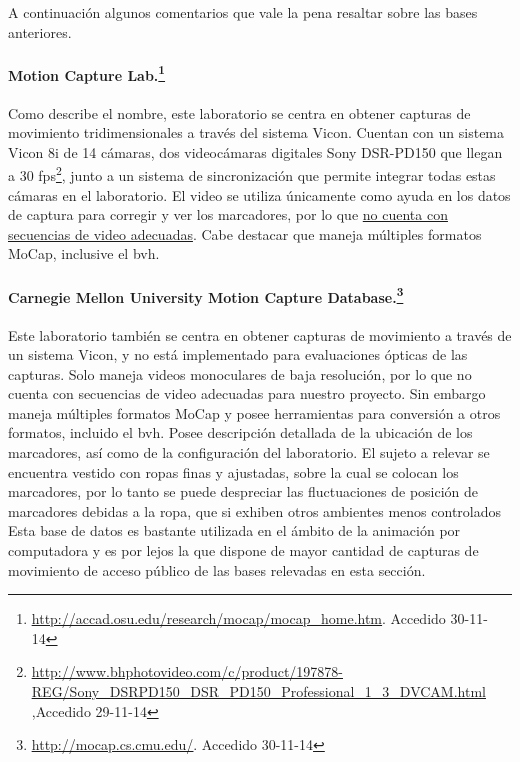 A continuación algunos comentarios que vale la pena resaltar sobre  las bases anteriores.

\paragraph{Motion Capture Lab.\footnote{\textcolor{blue}{\underline{\url{http://accad.osu.edu/research/mocap/mocap_home.htm}}}. Accedido 30-11-14}} 
		Como describe el nombre, este laboratorio se centra en obtener capturas de movimiento tridimensionales a través del sistema Vicon. Cuentan con un sistema Vicon 8i de 14 cámaras, dos videocámaras digitales Sony DSR-PD150 que llegan a 30 fps\footnote{\textcolor{blue}{\underline{\url{http://www.bhphotovideo.com/c/product/197878-REG/Sony_DSRPD150_DSR_PD150_Professional_1_3_DVCAM.html}}} ,Accedido 29-11-14 }, junto a un sistema de sincronización que permite integrar todas estas cámaras en el laboratorio. El video se utiliza únicamente como ayuda en los datos de captura para corregir y ver los marcadores,  por lo que \underline{no cuenta con secuencias de video adecuadas}. Cabe destacar que maneja múltiples formatos MoCap, inclusive el bvh.

\paragraph{Carnegie Mellon University Motion Capture Database.\footnote{\textcolor{blue}{\underline{\url{http://mocap.cs.cmu.edu/}}}. Accedido 30-11-14}}
 Este laboratorio también se centra en obtener capturas de movimiento a través de un sistema Vicon, y no está implementado para evaluaciones ópticas de las capturas. Solo maneja videos monoculares de baja resolución, por lo que no cuenta con secuencias de video adecuadas para nuestro proyecto. Sin embargo maneja múltiples formatos MoCap y  posee herramientas para conversión a otros formatos, incluido el bvh. Posee descripción detallada de la ubicación de los marcadores, así como de la configuración del laboratorio. El sujeto a relevar se encuentra vestido con ropas finas y ajustadas, sobre la cual se colocan los marcadores, por lo tanto se puede despreciar las fluctuaciones de posición de marcadores debidas a la ropa, que si exhiben otros ambientes menos controlados  Esta base de datos es bastante utilizada en el ámbito de la  animación por computadora y es por lejos la que dispone de mayor cantidad de capturas de movimiento de acceso público de las bases relevadas en esta sección.

